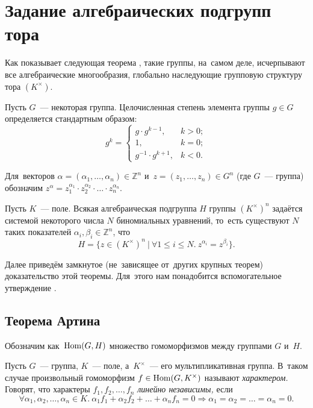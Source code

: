 \documentclass[a4paper,oneside]{article}
\newcommand{\notewrap}[1]{(#1)}
\begin{document}
\section{Задание алгебраических подгрупп тора}
Как показывает следующая теорема \cite{Schm94}, такие группы, на~самом деле, исчерпывают все алгебраические многообразия,
глобально наследующие групповую структуру тора $(K^\times)$.

Пусть $G$~— некоторая группа. Целочисленная степень элемента группы $g \in G$ определяется стандартным образом:
\[
  g^k =
  \begin{cases}
    g \cdot g^{k - 1}, & k > 0; \\
    1, & k = 0; \\
    g^{-1} \cdot g^{k + 1}, & k < 0.
  \end{cases}
\]

Для~векторов $\alpha = (\alpha_1, \ldots, \alpha_n) \in \mathbb{Z}^n$ и~$z = (z_1, \ldots, z_n) \in G^n$ (где $G$~— группа)
обозначим $z^\alpha = z_1^{\alpha_1} \cdot z_2^{\alpha_2} \cdot \ldots \cdot z_n^{\alpha_n}$.

\begin{theorem*}[\notewrap{Шмидт}]
  Пусть $K$~— поле. Всякая алгебраическая подгруппа $H$ группы $(K^{\times})^n$ задаётся
  системой некоторого числа $N$ биномиальных уравнений, то~есть существуют $N$ таких показателей $\alpha_i, \beta_i \in \mathbb{Z}^n$, что
  \[
    H = \{ z \in (K^{\times})^n\ |\ \forall 1 \leq i \leq N.\ z^{\alpha_i} = z^{\beta_i} \}.
  \]
\end{theorem*}

Далее приведём замкнутое (не~зависящее от~других крупных теорем) доказательство этой теоремы.
Для~этого нам понадобится вспомогательное утверждение \cite{Art48}.

\subsection{Теорема Артина}
Обозначим как~$\mathrm{Hom}(G, H)$ множество гомоморфизмов между группами $G$ и~$H$.

Пусть $G$~— группа, $K$~— поле, а~$K^{\times}$~— его мультипликативная группа.
В~таком случае произвольный гомоморфизм $f \in \mathrm{Hom}(G, K^{\times})$ называют \textit{характером.}
Говорят, что характеры $f_1, f_2, \ldots, f_n$ \textit{линейно независимы,}
если
\[
  \forall \alpha_1, \alpha_2, \ldots, \alpha_n \in K.\ \alpha_1 f_1 + \alpha_2 f_2 + \ldots + \alpha_n f_n = 0 \Rightarrow \alpha_1 = \alpha_2 = \ldots = \alpha_n = 0.
\]
\end{document}
